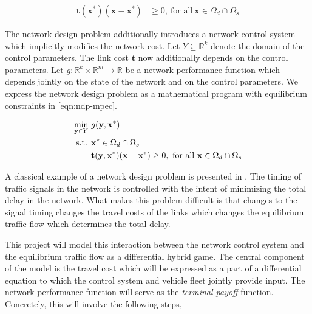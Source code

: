 \begin{align}
    \mathbf{t}(\mathbf{x^*})(\mathbf{x}- \mathbf{x^*}) &\geq 0,\ \text{for all}\ \mathbf{x} \in \Omega_d\cap \Omega_s \label{eqn:ui-vi}
\end{align}

The network design problem additionally introduces a network control system which implicitly modifies the network cost. Let $Y\subseteq \mathbb{R}^k$ denote the domain of the control parameters. The link cost $\mathbf{t}$ now additionally depends on the control parameters. Let $g:\mathbb{R}^k\times \mathbb{R}^m\to \mathbb{R}$ be a network performance function which depends jointly on the state of the network and on the control parameters. We express the network design problem as a mathematical program with equilibrium constraints in \eqref{eqn:ndp-mpec}.

\begin{subequations}
\begin{align}
    \min_{\mathbf{y}\in Y}\ & g(\mathbf{y}, \mathbf{x^*})\\
    \text{ s.t. } 
        & \mathbf{x^*} \in \Omega_d \cap \Omega_s\\
        &  \mathbf{t}(\mathbf{y}, \mathbf{x^*})(\mathbf{x}- \mathbf{x^*}) \geq 0,\ \text{for all}\ \mathbf{x} \in \Omega_d\cap \Omega_s
\end{align}\label{eqn:ndp-mpec}
\end{subequations}

A classical example of a network design problem is presented in \citet{sheffi1983optimal}. The timing of traffic signals in the network is controlled with the intent of minimizing the total delay in the network. What makes this problem difficult is that changes to the signal timing changes the travel costs of the links which changes the equilibrium traffic flow which determines the total delay.

This project will model this interaction between the network control system and the equilibrium traffic flow as a differential hybrid game. The central component of the model is the travel cost which will be expressed as a part of a differential equation to which the control system and vehicle fleet jointly provide input. The network performance function will serve as the \textit{terminal payoff} function. Concretely, this will involve the following steps,

